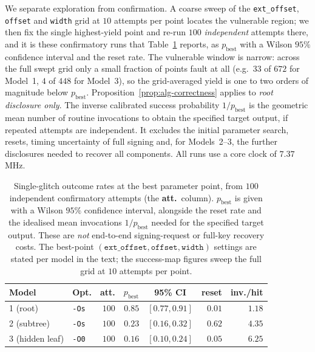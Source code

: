 We separate exploration from confirmation. A coarse sweep of the
\texttt{ext\_offset}, \texttt{offset} and \texttt{width} grid at $10$ attempts
per point locates the vulnerable region; we then fix the single highest-yield
point and re-run $100$ \emph{independent} attempts there, and it is these
confirmatory runs that Table~\ref{tab:fault-success} reports, as
$p_{\mathrm{best}}$ with a Wilson $95\%$ confidence interval and the reset
rate. The vulnerable window is narrow: across the full swept grid only a small
fraction of points fault at all (e.g.\ $33$ of $672$ for Model~1, $4$ of $448$
for Model~3), so the grid-averaged yield is one to two orders of magnitude
below $p_{\mathrm{best}}$. Proposition~\ref{prop:alg-correctness} applies to \emph{root
disclosure only}. The inverse calibrated success probability $1/p_{\mathrm{best}}$
is the geometric mean number of routine invocations to obtain the specified
target output, if repeated attempts are independent. It excludes the initial
parameter search, resets, timing uncertainty of full signing and, for
Models~2--3, the further disclosures needed to recover all components. All runs use a core clock of $7.37$\,MHz.

\begin{table}[htp]
\centering
\caption{Single-glitch outcome rates at the best parameter point, from
$100$ independent confirmatory attempts (the \textbf{att.}\ column).
$p_{\mathrm{best}}$ is given with a Wilson $95\%$ confidence interval, alongside
the reset rate and the idealised mean
invocations $1/p_{\mathrm{best}}$ needed for the specified target output.
These are \emph{not} end-to-end signing-request or full-key recovery costs. The best-point
$(\texttt{ext\_offset},\texttt{offset},\texttt{width})$ settings are stated per
model in the text; the success-map figures sweep the full grid at $10$ attempts
per point.}
\label{tab:fault-success}
\setlength{\tabcolsep}{5pt}
\small
\begin{tabular}{@{}l|l|r|r|c|r|r@{}}
\toprule
\textbf{Model} & \textbf{Opt.} & \textbf{att.} & $p_{\mathrm{best}}$ &
\textbf{95\% CI} & \textbf{reset} & \textbf{inv./hit} \\
\midrule
1 (root)        & \texttt{-Os} & $100$ & $0.85$ & $[0.77,0.91]$ & $0.01$ & $1.18$ \\
\midrule
2 (subtree)     & \texttt{-Os} & $100$ & $0.23$ & $[0.16,0.32]$ & $0.62$ & $4.35$ \\
\midrule
3 (hidden leaf) & \texttt{-O0} & $100$ & $0.16$ & $[0.10,0.24]$ & $0.05$ & $6.25$ \\
\bottomrule
\end{tabular}
\end{table}

